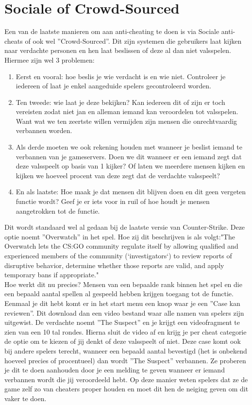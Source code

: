 \documentclass[pdftex,a4paper,12pt,twoside]{report}
\begin{document}
\section{Sociale of Crowd-Sourced}
\label{sec:sociale}
Een van de laatste manieren om aan anti-cheating te doen is via Sociale anti-cheats of ook wel ''Crowd-Sourced''. Dit zijn systemen die gebruikers laat kijken naar verdachte personen en hen laat beslissen of deze al dan niet valsspelen. 
\\

Hiermee zijn wel 3 problemen:
\begin{enumerate}  
\item Eerst en vooral: hoe beslis je wie verdacht is en wie niet. Controleer je iedereen of laat je enkel aangeduide spelers gecontroleerd worden.
\item Ten tweede: wie laat je deze bekijken? Kan iedereen dit of zijn er toch vereisten zodat niet jan en alleman iemand kan veroordelen tot valsspelen. Want wat we ten zeertste willen vermijden zijn mensen die onrechtvaardig verbannen worden.
\item Als derde moeten we ook rekening houden met wanneer je beslist iemand te verbannen van je gameservers. Doen we dit wanneer er een iemand zegt dat deze valsspeelt op basis van 1 kijker? Of laten we meerdere mensen kijken en kijken we hoeveel procent van deze zegt dat de verdachte valsspeelt?
\item En als laatste: Hoe maak je dat mensen dit blijven doen en dit geen vergeten functie wordt? Geef je er iets voor in ruil of hoe houdt je mensen aangetrokken tot de functie.
\end{enumerate}

Dit wordt standaard wel al gedaan bij de laatste versie van Counter-Strike. Deze optie noemt ''Overwatch'' in het spel.
Hoe zij dit beschrijven is als volgt:"The Overwatch lets the CS:GO community regulate itself by allowing qualified and experienced members of the community (‘investigators‘) to review reports of disruptive behavior, determine whether those reports are valid, and apply temporary bans if appropriate." \citep{overwatch}
\\

Hoe werkt dit nu precies? Mensen van een bepaalde rank binnen het spel en die een bepaald aantal spellen al gespeeld hebben krijgen toegang tot de functie. Eenmaal je dit hebt komt er in het start menu een knop waar je een ''Case kan reviewen''. Dit download dan een video bestand waar alle namen van spelers zijn uitgewist. De verdachte noemt ''The Suspect'' en je krijgt een videofragment te zien van een 10 tal rondes. Hierna sluit de video af en krijg je per cheat categorie de optie om te kiezen of jij denkt of deze valsspeelt of niet. Deze case komt ook bij andere spelers terecht, wanneer een bepaald aantal bevestigd (het is onbekend hoeveel precies of procentueel) dan wordt ''The Suspect'' verbannen. Ze proberen je dit te doen aanhouden door je een melding te geven wanneer er iemand verbannen wordt die jij veroordeeld hebt. Op deze manier weten spelers dat ze de game zelf zo van cheaters proper houden en moet dit hen de neiging geven om dit vaker te doen.
\\
\end{document}
